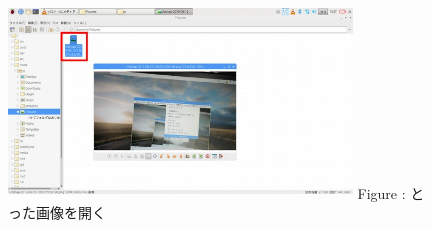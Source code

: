 \documentclass[a4paper,12pt]{jarticle}
\begin{document}
\begin{figure}
  \centering
  \begin{minipage}{9.162cm}
    {\upshape
      \includegraphics[width=9.125cm,height=5.182cm]{textbook-img122.jpg}
      \newline
      Figure {\theFigure\label{seq:refFigure28}}:
      とった画像を開く}
  \end{minipage}
\end{figure}

\bigskip

\clearpage
\end{document}
